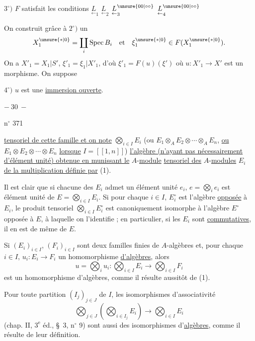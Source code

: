 $3^\circ)$ $F$ satisfait les conditions $\underset{\leftarrow}{L}_1$ $\underset{\leftarrow}{L}_2$ $\underset{\leftarrow}{L}_3^{\unsure{00|\circ\circ}}$ $\underset{\leftarrow}{L}_4^{\unsure{00|\circ\circ}}$

On construit grâce à $2^\circ)$ un
\[
X_1^{\unsure{*|0}}=\coprod_i\operatorname{Spec}B_i\quad\text{et}\quad\xi_1^{\unsure{*|0}}\in F(X_1^{\unsure{*|0}}).
\]
On a $X'_1=X_1|S'$, $\xi'_1=\xi_1|X'_1$, d'où $\xi'_1=F(u)(\xi')$ où $u:X'_1\to X'$ est un morphisme. On suppose

$4^\circ)$ $u$ est une \uline{immersion ouverte}.

\begin{center}$-\ 30\ -$\end{center}
\hfill n$^\circ$ 371

\uline{tensoriel de cette famille et on note} $\bigotimes_{i\in I}E_i$ (ou $E_1\otimes_A E_2\otimes\cdots\otimes_A E_n$, \uline{ou} $E_1\otimes E_2\otimes\cdots\otimes E_n$ \uline{lorsque} $I=\left[\!\left[1,n\right]\!\right]$) \uline{l'algèbre (n'ayant pas nécessairement d'élément unité) obtenue en munissant le} $A$-\uline{module}  \uline{tensoriel des} $A$-\uline{modules} $E_i$ \uline{de la multiplication définie par} (1).

Il est clair que si chacune des $E_i$ admet un élément unité $e_i$, $e=\bigotimes_i e_i$ est élément unité de $E=\bigotimes_{i\in I}E_i$. Si pour chaque $i\in I$, $E_i^\circ$ est l'algèbre \uline{opposée} à $E_i$, le produit tensoriel $\bigotimes_{i\in I}E_i^\circ$ est canoniquement isomorphe à l'algèbre $E^\circ$ opposée à $E$, à laquelle on l'identifie ; en particulier, si les $E_i$ sont \uline{commutatives}, il en est de même de $E$.

Si $(E_i)_{i\in I}$, $(F_i)_{i\in I}$ sont deux familles finies de $A$-algèbres et, pour chaque $i\in I$, $u_i:E_i\to F_i$ un homomorphisme \uline{d'algèbres}, alors
\[
u=\bigotimes_i u_i:\bigotimes_{i\in I}E_i\longrightarrow\bigotimes_{i\in I}F_i
\]
est un homomorphisme d'algèbres, comme il résulte aussitôt de (1).

Pour toute partition $(I_j)_{j\in J}$ de $I$, les isomorphismes d'associativité
\[
\bigotimes_{j\in J}\left(\bigotimes_{i\in I_j}E_i\right)\longrightarrow\bigotimes_{i\in I}E_i
\]
(chap. II, $3^{\mathrm e}$ éd., \S\ 3, n$^\circ$ 9) sont aussi des isomorphismes d'\uline{algèbres}, comme il résulte de leur définition.

